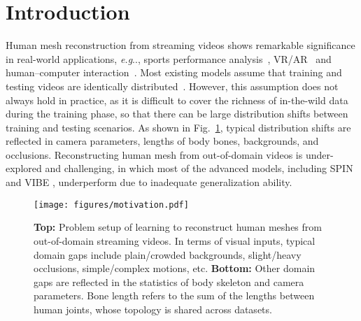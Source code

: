 \documentclass[10pt,journal,compsoc]{IEEEtran}
\makeatletter
\let\MYoriglatexcaption\caption
\renewcommand{\caption}[2][\relax]{\MYoriglatexcaption[#2]{#2}}
\DeclareRobustCommand\onedot{\futurelet\@let@token\@onedot}
\def\@onedot{\ifx\@let@token.\else.\null\fi\xspace}
\def\eg{\emph{e.g}\onedot} \def\Eg{\emph{E.g}\onedot}
\newcommand{\fig}[1]{Fig.~\ref{#1}}
\makeatother
\begin{document}
\maketitle


\IEEEdisplaynontitleabstractindextext




\IEEEpeerreviewmaketitle






























\section{Introduction}

Human mesh reconstruction from streaming videos shows remarkable significance in real-world applications, \eg, sports performance analysis~\cite{rematas2018soccer,chen2021sportscap}, VR/AR~\cite{lin2016virtual,cha2018towards,weng2019photo} and human–computer interaction~\cite{zhang2020perceiving,guzov2021human,hassan2021populating}.
Most existing models assume that training and testing videos are identically distributed~\cite{kanazawa2018end,pavlakos2018learning,kolotouros2019learning,aksan2019structured,xu2019denserac,guler2019holopose,Moon_2020_ECCV_I2L-MeshNet,kocabas2020vibe}.
However, this assumption does not always hold in practice, as it is difficult to cover the richness of in-the-wild data during the training phase, so that there can be large distribution shifts between training and testing scenarios.
As shown in \fig{fig:problem}, typical distribution shifts are reflected in camera parameters, lengths of body bones, backgrounds, and occlusions.
Reconstructing human mesh from out-of-domain videos is under-explored and challenging, in which most of the advanced models, including SPIN \cite{kolotouros2019learning} and VIBE \cite{kocabas2020vibe}, underperform due to inadequate generalization ability.




\begin{figure}[t]
    \centering
    \texttt{[image: figures/motivation.pdf]}
    \caption{\textbf{Top:} Problem setup of learning to reconstruct human meshes from out-of-domain streaming videos. In terms of visual inputs, typical domain gaps include plain/crowded backgrounds, slight/heavy occlusions, simple/complex motions, etc.
    \textbf{Bottom:} Other domain gaps are reflected in the statistics of body skeleton and camera parameters. Bone length refers to the sum of the lengths between human joints, whose topology is shared across datasets.}
    \label{fig:problem}
    \vspace{-5pt}
\end{figure}
\end{document}

